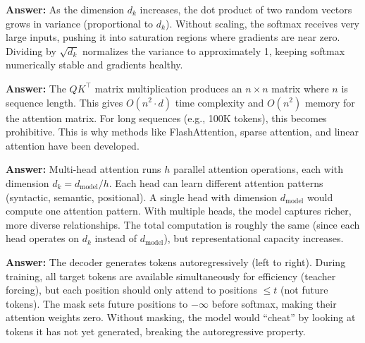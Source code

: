 \documentclass[11pt, a4paper]{article}
\begin{document}
\begin{notebox}
\textbf{Answer:} As the dimension $d_k$ increases, the dot product of two random vectors grows in variance (proportional to $d_k$). Without scaling, the softmax receives very large inputs, pushing it into saturation regions where gradients are near zero. Dividing by $\sqrt{d_k}$ normalizes the variance to approximately 1, keeping softmax numerically stable and gradients healthy.
\end{notebox}

\begin{notebox}
\textbf{Answer:} The $QK^\top$ matrix multiplication produces an $n \times n$ matrix where $n$ is sequence length. This gives $O(n^2 \cdot d)$ time complexity and $O(n^2)$ memory for the attention matrix. For long sequences (e.g., 100K tokens), this becomes prohibitive. This is why methods like FlashAttention, sparse attention, and linear attention have been developed.
\end{notebox}

\begin{notebox}
\textbf{Answer:} Multi-head attention runs $h$ parallel attention operations, each with dimension $d_k = d_{\text{model}} / h$. Each head can learn different attention patterns (syntactic, semantic, positional). A single head with dimension $d_{\text{model}}$ would compute one attention pattern. With multiple heads, the model captures richer, more diverse relationships. The total computation is roughly the same (since each head operates on $d_k$ instead of $d_{\text{model}}$), but representational capacity increases.
\end{notebox}

\begin{notebox}
\textbf{Answer:} The decoder generates tokens autoregressively (left to right). During training, all target tokens are available simultaneously for efficiency (teacher forcing), but each position should only attend to positions $\leq t$ (not future tokens). The mask sets future positions to $-\infty$ before softmax, making their attention weights zero. Without masking, the model would ``cheat'' by looking at tokens it has not yet generated, breaking the autoregressive property.
\end{notebox}
\end{document}

